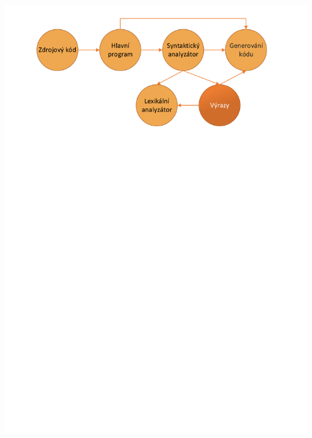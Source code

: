 \documentclass[11pt, hyperref={unicode}]{beamer}
\begin{document}
\begin{frame}
\begin{overprint}
 	\centerline{\includegraphics[width=0.95\linewidth]{img/vyrazy.pdf}}%

\end{overprint}
\end{frame}
\end{document}
